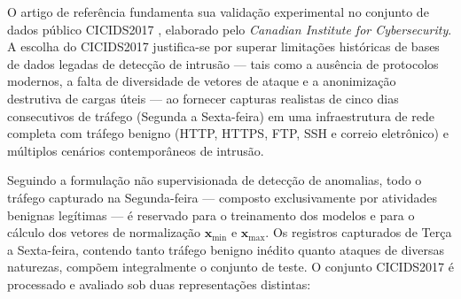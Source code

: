 \documentclass[conference]{IEEEtran}
\begin{document}
O artigo de referência \cite{hashemi2020} fundamenta sua validação experimental no conjunto de dados público CICIDS2017 \cite{sharafaldin2018}, elaborado pelo \textit{Canadian Institute for Cybersecurity}.
A escolha do CICIDS2017 justifica-se por superar limitações históricas de bases de dados legadas de detecção de intrusão — tais como a ausência de protocolos modernos, a falta de diversidade de vetores de ataque e a anonimização destrutiva de cargas úteis — ao fornecer capturas realistas de cinco dias consecutivos de tráfego (Segunda a Sexta-feira) em uma infraestrutura de rede completa com tráfego benigno (HTTP, HTTPS, FTP, SSH e correio eletrônico) e múltiplos cenários contemporâneos de intrusão.

Seguindo a formulação não supervisionada de detecção de anomalias, todo o tráfego capturado na Segunda-feira — composto exclusivamente por atividades benignas legítimas — é reservado para o treinamento dos modelos e para o cálculo dos vetores de normalização $\mathbf{x}_{\min}$ e $\mathbf{x}_{\max}$.
Os registros capturados de Terça a Sexta-feira, contendo tanto tráfego benigno inédito quanto ataques de diversas naturezas, compõem integralmente o conjunto de teste.
O conjunto CICIDS2017 é processado e avaliado sob duas representações distintas:
\end{document}
